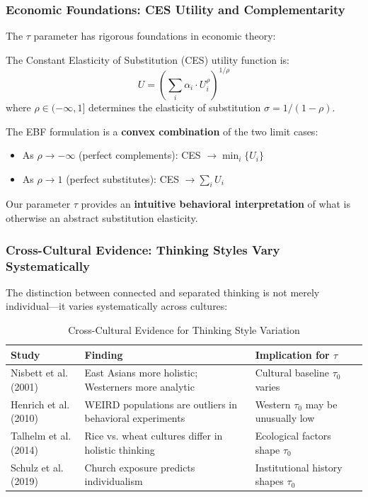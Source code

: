 \subsubsection{Economic Foundations: CES Utility and Complementarity}

The $\tau$ parameter has rigorous foundations in economic theory:

\begin{definition}
The Constant Elasticity of Substitution (CES) utility function is:
\begin{equation}
U = \left( \sum_i \alpha_i \cdot U_i^{\rho} \right)^{1/\rho}
\end{equation}
where $\rho \in (-\infty, 1]$ determines the elasticity of substitution $\sigma = 1/(1-\rho)$.
\end{definition}

The EBF formulation is a \textbf{convex combination} of the two limit cases:
\begin{itemize}
\item As $\rho \to -\infty$ (perfect complements): CES $\to \min_i\{U_i\}$
\item As $\rho \to 1$ (perfect substitutes): CES $\to \sum_i U_i$
\end{itemize}

Our parameter $\tau$ provides an \textbf{intuitive behavioral interpretation} of what is otherwise an abstract substitution elasticity.

\subsubsection{Cross-Cultural Evidence: Thinking Styles Vary Systematically}

The distinction between connected and separated thinking is not merely individual—it varies systematically across cultures:

\begin{table}[htbp]
\centering
\caption{Cross-Cultural Evidence for Thinking Style Variation}
\label{tab:cultural-tau}
\begin{tabular}{p{3cm}p{3cm}p{6cm}}
\toprule
\textbf{Study} & \textbf{Finding} & \textbf{Implication for $\tau$} \\
\midrule
Nisbett et al. (2001) & East Asians more holistic; Westerners more analytic & Cultural baseline $\tau_0$ varies \\[4pt]

Henrich et al. (2010) & WEIRD populations are outliers in behavioral experiments & Western $\tau_0$ may be unusually low \\[4pt]

Talhelm et al. (2014) & Rice vs. wheat cultures differ in holistic thinking & Ecological factors shape $\tau_0$ \\[4pt]

Schulz et al. (2019) & Church exposure predicts individualism & Institutional history shapes $\tau_0$ \\
\bottomrule
\end{tabular}
\end{table}

